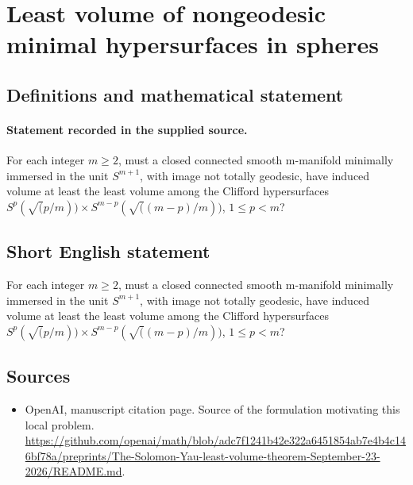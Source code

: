 \documentclass[11pt]{article}
\begin{document}
\section*{Least volume of nongeodesic minimal hypersurfaces in spheres}\label{30007158}
\subsection{Definitions and mathematical statement}
\paragraph{Statement recorded in the supplied source.}
For each integer $m\geq 2$, must a closed connected smooth m-manifold minimally immersed in the unit $S^{m+1}$, with image not totally geodesic, have induced volume at least the least volume among the Clifford hypersurfaces $S^p(\surd (p/m))×S^{m-p}(\surd ((m-p)/m))$, $1\leq p<m$?
\subsection{Short English statement}
For each integer $m\geq 2$, must a closed connected smooth m-manifold minimally immersed in the unit $S^{m+1}$, with image not totally geodesic, have induced volume at least the least volume among the Clifford hypersurfaces $S^p(\surd (p/m))×S^{m-p}(\surd ((m-p)/m))$, $1\leq p<m$?
\subsection{Sources}
\begin{itemize}
\item[S1] OpenAI, manuscript citation page. Source of the formulation motivating this local problem.
\url{https://github.com/openai/math/blob/adc7f1241b42e322a6451854ab7e4b4c146bf78a/preprints/The-Solomon-Yau-least-volume-theorem-September-23-2026/README.md}.
\end{itemize}
\end{document}
